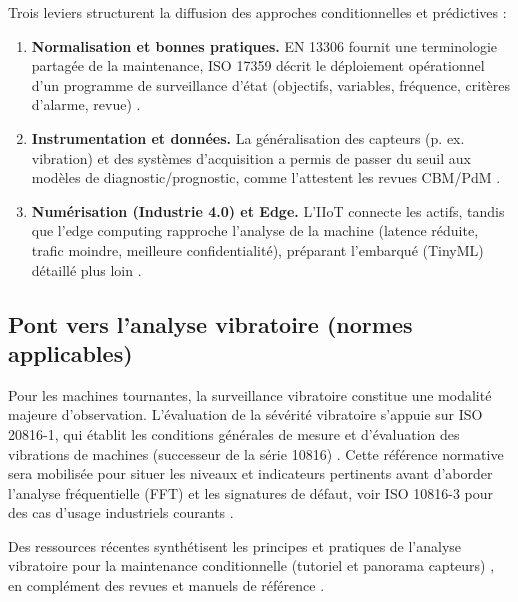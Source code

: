 Trois leviers structurent la diffusion des approches conditionnelles et prédictives :

\begin{enumerate}
\item \textbf{Normalisation et bonnes pratiques.} EN 13306 fournit une terminologie partagée de la maintenance, ISO 17359 décrit le déploiement opérationnel d'un programme de surveillance d'état (objectifs, variables, fréquence, critères d'alarme, revue) \cite{en13306,iso17359}.

\item \textbf{Instrumentation et données.} La généralisation des capteurs (p. ex. vibration) et des systèmes d'acquisition a permis de passer du seuil aux modèles de diagnostic/prognostic, comme l'attestent les revues CBM/PdM \cite{jardine2006,lee2014,hector2024,achouch2022}.

\item \textbf{Numérisation (Industrie 4.0) et Edge.} L'IIoT connecte les actifs, tandis que l'edge computing rapproche l'analyse de la machine (latence réduite, trafic moindre, meilleure confidentialité), préparant l'embarqué (TinyML) détaillé plus loin \cite{lasi2014,kagermann2013,shi2016,kong2022}.
\end{enumerate}

\subsection{Pont vers l'analyse vibratoire (normes applicables)}

Pour les machines tournantes, la surveillance vibratoire constitue une modalité majeure d'observation. L'évaluation de la sévérité vibratoire s'appuie sur ISO 20816-1, qui établit les conditions générales de mesure et d'évaluation des vibrations de machines (successeur de la série 10816) \cite{iso20816-1}. Cette référence normative sera mobilisée pour situer les niveaux et indicateurs pertinents avant d'aborder l'analyse fréquentielle (FFT) et les signatures de défaut, voir ISO 10816-3 pour des cas d'usage industriels courants \cite{iso20816-3}.

Des ressources récentes synthétisent les principes et pratiques de l'analyse vibratoire pour la maintenance conditionnelle (tutoriel et panorama capteurs) \cite{matania2024,hassan2024}, en complément des revues et manuels de référence \cite{tiboni2022,mobley2002}.

